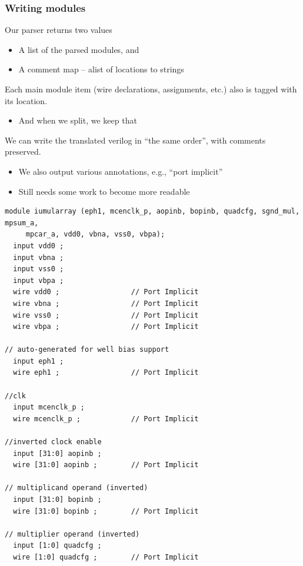 \documentclass[mathserif]{beamer}
\begin{document}
\begin{frame}
\frametitle{Writing modules}

Our parser returns two values
\begin{itemize}
\item A list of the parsed modules, and
\item A comment map -- alist of locations to strings
\end{itemize}

\bigskip

Each main module item (wire declarations, assignments, etc.) also is tagged
with its location.  
\begin{itemize}
\item And when we split, we keep that
\end{itemize}

\bigskip

We can write the translated verilog in ``the same order'', with comments
preserved.
\begin{itemize}
\item We also output various annotations, e.g., ``port implicit''
\item Still needs some work to become more readable
\end{itemize}

\end{frame}

\begin{frame}[fragile]

{\tiny
\begin{verbatim}
module iumularray (eph1, mcenclk_p, aopinb, bopinb, quadcfg, sgnd_mul, mpsum_a,
     mpcar_a, vdd0, vbna, vss0, vbpa);
  input vdd0 ;
  input vbna ;
  input vss0 ;
  input vbpa ;
  wire vdd0 ;                 // Port Implicit
  wire vbna ;                 // Port Implicit
  wire vss0 ;                 // Port Implicit
  wire vbpa ;                 // Port Implicit

// auto-generated for well bias support
  input eph1 ;
  wire eph1 ;                 // Port Implicit

//clk
  input mcenclk_p ;
  wire mcenclk_p ;            // Port Implicit

//inverted clock enable
  input [31:0] aopinb ;
  wire [31:0] aopinb ;        // Port Implicit

// multiplicand operand (inverted)
  input [31:0] bopinb ;
  wire [31:0] bopinb ;        // Port Implicit

// multiplier operand (inverted)
  input [1:0] quadcfg ;
  wire [1:0] quadcfg ;        // Port Implicit
\end{verbatim}
}

\end{frame}
\end{document}
